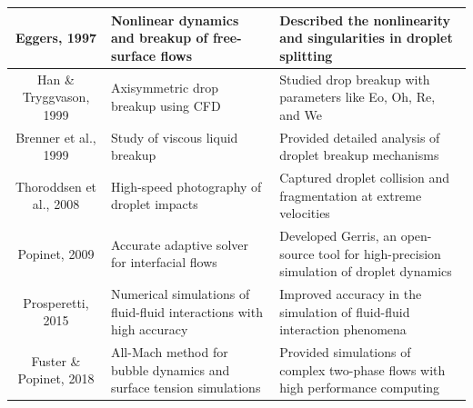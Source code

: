 \documentclass[12pt]{article}
\begin{document}
\begin{table}[htbp]
\begin{tabularx}{\textwidth}{|c|X|X|}
Eggers, 1997\cite{eggers1997nonlinear}                 & Nonlinear dynamics and breakup of free-surface flows                   & Described the nonlinearity and singularities in droplet splitting                       \\ \hline
Han \& Tryggvason, 1999\cite{han1999axisymmetric}      & Axisymmetric drop breakup using CFD                                    & Studied drop breakup with parameters like Eo, Oh, Re, and We                            \\ \hline
Brenner et al., 1999\cite{brenner1999breakup}         & Study of viscous liquid breakup                                        & Provided detailed analysis of droplet breakup mechanisms                                \\ \hline
Thoroddsen et al., 2008\cite{thoroddsen2008highspeed}      & High-speed photography of droplet impacts                             & Captured droplet collision and fragmentation at extreme velocities                      \\ \hline
Popinet, 2009\cite{popinet2009gerris}                & Accurate adaptive solver for interfacial flows                        & Developed Gerris, an open-source tool for high-precision simulation of droplet dynamics \\ \hline
Prosperetti, 2015\cite{prosperetti2015fluidfluid}            & Numerical simulations of fluid-fluid interactions with high accuracy   & Improved accuracy in the simulation of fluid-fluid interaction phenomena                \\ \hline
Fuster \& Popinet, 2018\cite{fuster2018allmach}      & All-Mach method for bubble dynamics and surface tension simulations    & Provided simulations of complex two-phase flows with high performance computing         \\ \hline
\end{tabularx}
\end{table}




\end{document}
